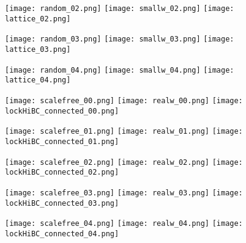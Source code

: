 \documentclass[DIV=12, BCOR=0pt]{scrartcl}  %
\begin{document}
  \begin{figure}[h!]
  	\centering
  	\texttt{[image: random\_02.png]}
  	\texttt{[image: smallw\_02.png]}
  	\texttt{[image: lattice\_02.png]}
  	
  	\texttt{[image: random\_03.png]}
  	\texttt{[image: smallw\_03.png]}
  	\texttt{[image: lattice\_03.png]}
  	
  	\texttt{[image: random\_04.png]}
  	\texttt{[image: smallw\_04.png]}
  	\texttt{[image: lattice\_04.png]}
  	
  	\caption{ }
  	\label{fig:outcomes0}
  \end{figure}
  
  \clearpage
  
  \begin{figure}[h!]
  	\centering
  	\texttt{[image: scalefree\_00.png]}
  	\texttt{[image: realw\_00.png]}
  	\texttt{[image: lockHiBC\_connected\_00.png]}
  	
  	\texttt{[image: scalefree\_01.png]}
  	\texttt{[image: realw\_01.png]}
  	\texttt{[image: lockHiBC\_connected\_01.png]}
  	\caption{ }
  	\label{fig:networks1}
  \end{figure}  	
  
  \begin{figure}[h!]
  	\centering
  	\texttt{[image: scalefree\_02.png]}
  	\texttt{[image: realw\_02.png]}
  	\texttt{[image: lockHiBC\_connected\_02.png]}
  	
  	\texttt{[image: scalefree\_03.png]}
  	\texttt{[image: realw\_03.png]}
  	\texttt{[image: lockHiBC\_connected\_03.png]}
  	
  	\texttt{[image: scalefree\_04.png]}
  	\texttt{[image: realw\_04.png]}
  	\texttt{[image: lockHiBC\_connected\_04.png]}
  	
  	\caption{ }
  	\label{fig:outcomes1}
  \end{figure}
  
\end{document}
